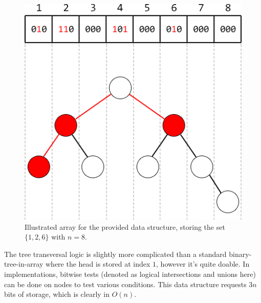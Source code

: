 \documentclass{article}
\begin{document}
\begin{enumerate}
\begin{enumerate}
            \begin{figure}[h]
                \begin{center}
                \includegraphics[scale=0.5]{csc263-a1-q3-illustration}
                \caption{Illustrated array for the provided data structure, storing the set $\{1, 2, 6\}$ with $n = 8$.}
                \end{center}
            \end{figure}

        The tree transversal logic is slightly more complicated than a standard binary-tree-in-array where the head is stored at index $1$, however it's quite doable. In implementations, bitwise tests (denoted as logical intersections and unions here) can be done on nodes to test various conditions. This data structure requests $3n$ bits of storage, which is clearly in $O(n)$.


\end{enumerate}
\end{enumerate}
\end{document}
